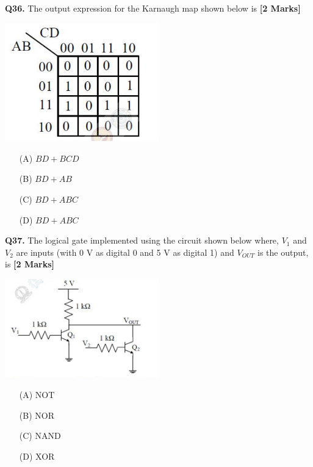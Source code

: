 \documentclass[11pt]{article}
\newcommand{\questionb}[2]{
    \noindent\textbf{Q#2.} #1 \hfill \textbf{[2 Marks]}
}
\begin{document}
\questionb{The output expression for the Karnaugh map shown below is}{36}
\begin{center}
\includegraphics[width=0.5\textwidth]{figures/36.png}
\end{center}
\begin{enumerate}
    \item[(A)] \( BD + BCD \)  
    \item[(B)] \( BD + AB \)  
    \item[(C)] \( BD + ABC \)  
    \item[(D)] \( BD + ABC \)  
\end{enumerate}
\vspace{0.5cm}

\questionb{The logical gate implemented using the circuit shown below where, \( V_1 \) and \( V_2 \) are inputs (with 0 V as digital 0 and 5 V as digital 1) and \( V_{OUT} \) is the output, is}{37}
\begin{center}
\includegraphics[width=0.5\textwidth]{figures/37.png}
\end{center}
\begin{enumerate}
    \item[(A)] NOT  
    \item[(B)] NOR  
    \item[(C)] NAND  
    \item[(D)] XOR  
\end{enumerate}
\vspace{0.5cm}
\end{document}
